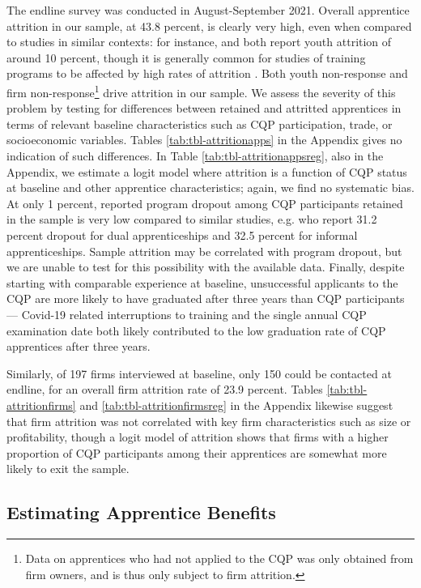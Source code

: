 \documentclass[
  a4paper, twoside, 12pt]{book}
\begin{document}
The endline survey was conducted in August-September 2021. Overall apprentice attrition in our sample, at 43.8 percent, is clearly very high, even when compared to studies in similar contexts: for instance, \textcite{crepon2019} and \textcite{hardy2019} both report youth attrition of around 10 percent, though it is generally common for studies of training programs to be affected by high rates of attrition \autocite{mckenzie2017}. Both youth non-response and firm non-response\footnote{Data on apprentices who had not applied to the CQP was only obtained from firm owners, and is thus only subject to firm attrition.} drive attrition in our sample. We assess the severity of this problem by testing for differences between retained and attritted apprentices in terms of relevant baseline characteristics such as CQP participation, trade, or socioeconomic variables. Tables \ref{tab:tbl-attritionapps} in the Appendix gives no indication of such differences. In Table \ref{tab:tbl-attritionappsreg}, also in the Appendix, we estimate a logit model where attrition is a function of CQP status at baseline and other apprentice characteristics; again, we find no systematic bias. At only 1 percent, reported program dropout among CQP participants retained in the sample is very low compared to similar studies, e.g. \textcite{crepon2019} who report 31.2 percent dropout for dual apprenticeships and 32.5 percent for informal apprenticeships. Sample attrition may be correlated with program dropout, but we are unable to test for this possibility with the available data. Finally, despite starting with comparable experience at baseline, unsuccessful applicants to the CQP are more likely to have graduated after three years than CQP participants --- Covid-19 related interruptions to training and the single annual CQP examination date both likely contributed to the low graduation rate of CQP apprentices after three years.

Similarly, of 197 firms interviewed at baseline, only 150 could be contacted at endline, for an overall firm attrition rate of 23.9 percent. Tables \ref{tab:tbl-attritionfirms} and \ref{tab:tbl-attritionfirmsreg} in the Appendix likewise suggest that firm attrition was not correlated with key firm characteristics such as size or profitability, though a logit model of attrition shows that firms with a higher proportion of CQP participants among their apprentices are somewhat more likely to exit the sample.

\hypertarget{appmethod}{%
\subsection{Estimating Apprentice Benefits}\label{appmethod}}
\end{document}

